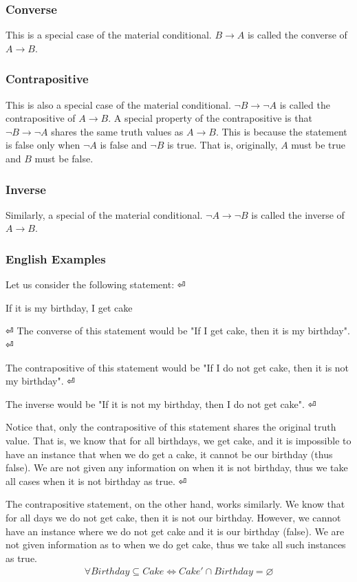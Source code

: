 \documentclass[a4paper]{article}
\theoremstyle{plain}
\theoremstyle{definition}
\newtheorem{exmp}{Example}[section]
\theoremstyle{remark}
\begin{document}
\subsubsection{Converse}
This is a special case of the material conditional. $B \to  A$ is called the converse of $A \to  B$.
\subsubsection{Contrapositive}
This is also a special case of the material conditional. $\neg B  \to  \neg A$ is called the contrapositive of $A \to B$. A special property of the contrapositive is that $\neg B \to  \neg A$ shares the same truth values as $A \to B$. This is because the statement is false only when $\neg A$ is false and $\neg B$ is true. That is, originally, $A$ must be true and $B$ must be false.
\subsubsection{Inverse}
Similarly, a special of the material conditional. $\neg A \to \neg B$ is called the inverse of $A \to  B$.
\subsubsection{English Examples}
\begin{tcolorbox}[colback=black!3!white,colframe=black!60!white,title=\begin{exmp}English Example \label{English Example}\end{exmp}]
Let us consider the following statement: ⏎
\begin{center}
	If it is my birthday, I get cake
\end{center} ⏎
The converse of this statement would be "If I get cake, then it is my birthday". ⏎

The contrapositive of this statement would be "If I do not get cake, then it is not my birthday".     ⏎

The inverse would be "If it is not my birthday, then I do not get cake". ⏎ 

Notice that, only the contrapositive of this statement shares the original truth value. That is,  we know that for all birthdays, we get cake, and it is impossible to have an instance that when we do get a cake, it cannot be our birthday (thus false). We are not given any information on when it is not birthday, thus we take all cases when it is not birthday as true. ⏎

The contrapositive statement, on the other hand, works similarly. We know that for all days we do not get cake, then it is not our birthday. However, we cannot have an instance where we do not get cake and it is our birthday (false). We are not given information as to when we do get cake, thus we take all such instances as true.
\begin{align*}
	\forall Birthday \subseteq Cake \iff Cake' \cap Birthday = \varnothing
\end{align*}
\end{tcolorbox}
\end{document}

